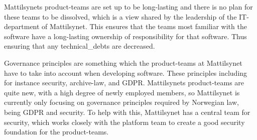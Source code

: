 Mattilsynets product-teams are set up to be long-lasting and there is no plan for these teams to be dissolved, which is a view shared by the leadership of the IT-department of Mattilsynet. This ensures that the teams most familiar with the software have a long-lasting ownership of responsibility for that software. Thus ensuring that any \gls{technical_debt}s are decreased.

Governance principles are something which the product-teams at Mattilsynet have to take into account when developing software. These principles including for instance security, archive-law, and GDPR. Mattilsynets product-teams are quite new, with a high degree of newly employed members, so Mattilsynet is currently only focusing on governance principles required by Norwegian law, being GDPR and security. To help with this, Mattilsynet has a central team for security, which works closely with the platform team to create a good security foundation for the product-teams.






